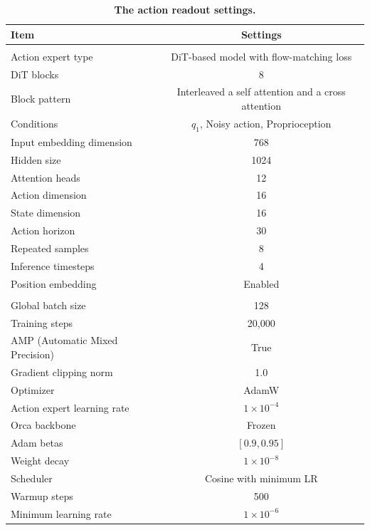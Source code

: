 \documentclass{llmxive}
\providecommand{\arraystretch}{1.12}
\begin{document}
\begin{table}[!htbp] 
\centering 
 
\begin{tabular}{lc} 
\toprule[1pt]
\textbf{Item} & \textbf{Settings} \\ 
\midrule
\rowcolor[rgb]{ .949,  .949,  .949}\multicolumn{2}{l}{\textit{Architecture}} \\
Action expert type & DiT-based model with flow-matching loss \\ 
DiT blocks & 8 \\ 
Block pattern & Interleaved a self attention and a cross attention \\
Conditions & \(q_{1}\), Noisy action, Proprioception \\ 
Input embedding dimension & 768 \\ 
Hidden size & 1024 \\ 
Attention heads & 12 \\ 
Action dimension & 16 \\ 
State dimension & 16 \\ 
Action horizon & 30 \\ 
Repeated samples & 8 \\ 
Inference timesteps & 4 \\ 
Position embedding & Enabled \\ 
\midrule 
\rowcolor[rgb]{ .949,  .949,  .949}\multicolumn{2}{l}{\textit{Training}} \\
Global batch size & 128 \\ 
Training steps & 20,000 \\ 
AMP (Automatic Mixed Precision) & True \\ 
Gradient clipping norm & 1.0 \\ 
Optimizer & AdamW \\ 
Action expert learning rate & \(1 \times 10^{-4}\) \\ 
Orca backbone & Frozen \\ 
Adam betas & \([0.9, 0.95]\) \\
Weight decay & \(1 \times 10^{-8}\) \\ Scheduler & Cosine with minimum LR \\ Warmup steps & 500 \\ Minimum learning rate & \(1 \times 10^{-6}\) \\ 
\bottomrule[1pt]
\end{tabular}
\caption{\textbf{The action readout settings.}}
\label{tab:appendix_action_readout_settings}
\end{table}
\end{document}
